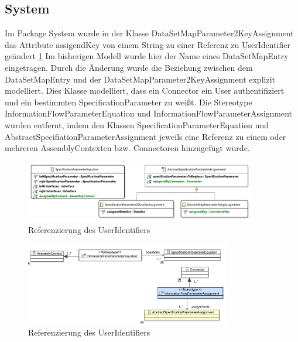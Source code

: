\documentclass[twoside, ngerman]{sdqseminar}
\begin{document}
\subsection{System}
Im Package System wurde in der Klasse DataSetMapParameter2KeyAssignment das Attribute assigendKey von einem String zu einer Referenz zu UserIdentifier geändert \ref{systemPackage} Im bisherigen Modell wurde hier der Name eines DataSetMapEntry eingetragen. Durch die Änderung wurde die Beziehung zwischen dem DataSetMapEntry und der DataSetMapParameter2KeyAssignment explizit modelliert. Dies Klasse modelliert, dass ein Connector ein User authentifiziert und ein bestimmten SpecificationParameter zu weißt. Die Stereotype InformationFlowParameterEquation und InformationFlowParameterAssignment wurden entfernt, indem den Klassen SpecificationParameterEquation und AbstractSpecifiationParameterAssignment jeweils eine Referenz zu einem oder mehreren AssemblyContexten bzw. Connectoren hinzugefügt wurde.
\begin{figure}[htbp]
	\label{systemPackage}
	\centering
	\includegraphics[width=0.9\textwidth]{images/new/system.pdf}
	\caption{Referenzierung des UserIdentifiers}
\end{figure}
\begin{figure}[htbp]
	\label{systemProfil}
	\centering
	\includegraphics[width=0.8\textwidth]{images/old/systemProfile.pdf}
	\caption{Referenzierung des UserIdentifiers}
\end{figure}
\end{document}
